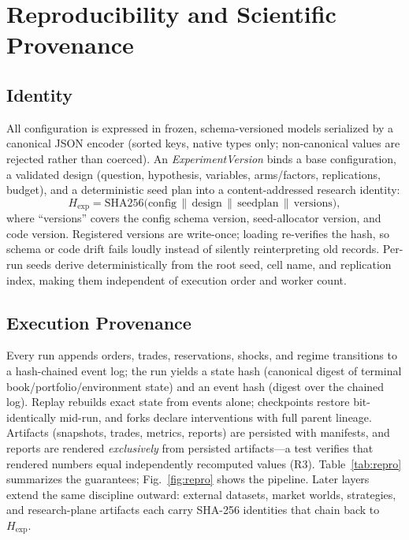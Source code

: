 \documentclass[conference]{IEEEtran}
\begin{document}
\section{Reproducibility and Scientific Provenance}
\label{sec:repro}

\subsection{Identity}
All configuration is expressed in frozen, schema-versioned models
serialized by a canonical JSON encoder (sorted keys, native types only;
non-canonical values are rejected rather than coerced). An
\emph{ExperimentVersion} binds a base configuration, a validated design
(question, hypothesis, variables, arms/factors, replications, budget),
and a deterministic seed plan into a content-addressed research
identity:
\begin{equation}
H_{\mathrm{exp}} = \mathrm{SHA256}\big(\mathrm{config} \,\|\,
\mathrm{design} \,\|\, \mathrm{seedplan} \,\|\, \mathrm{versions}\big),
\label{eq:hexp}
\end{equation}
where ``versions'' covers the config schema version, seed-allocator
version, and code version. Registered versions are write-once; loading
re-verifies the hash, so schema or code drift fails loudly instead of
silently reinterpreting old records. Per-run seeds derive
deterministically from the root seed, cell name, and replication index,
making them independent of execution order and worker count.

\subsection{Execution Provenance}
Every run appends orders, trades, reservations, shocks, and regime
transitions to a hash-chained event log; the run yields a state hash
(canonical digest of terminal book/portfolio/environment state) and an
event hash (digest over the chained log). Replay rebuilds exact state
from events alone; checkpoints restore bit-identically mid-run, and
forks declare interventions with full parent lineage. Artifacts
(snapshots, trades, metrics, reports) are persisted with manifests, and
reports are rendered \emph{exclusively} from persisted artifacts---a
test verifies that rendered numbers equal independently recomputed
values (R3). Table~\ref{tab:repro} summarizes the guarantees; Fig.\
\ref{fig:repro} shows the pipeline. Later layers extend the same
discipline outward: external datasets, market worlds, strategies, and
research-plane artifacts each carry SHA-256 identities that chain back
to $H_{\mathrm{exp}}$.
\end{document}
